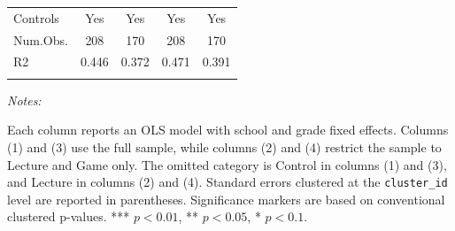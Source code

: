 \begin{table}[htbp]
\begin{tabular}{lcccc}
Controls & Yes & Yes & Yes & Yes \\
Num.Obs. & \num{208} & \num{170} & \num{208} & \num{170} \\
R2 & \num{0.446} & \num{0.372} & \num{0.471} & \num{0.391} \\
\\
\bottomrule
\hline
\hline
\end{tabular}
{\begin{flushleft}\parbox{\textwidth}{\tiny \hspace*{0.1cm}
\textit{Notes:}} Each column reports an OLS model with school and grade fixed effects. Columns (1) and (3) use the full sample, while columns (2) and (4) restrict the sample to Lecture and Game only. The omitted category is Control in columns (1) and (3), and Lecture in columns (2) and (4). Standard errors clustered at the \texttt{cluster\_id} level are reported in parentheses. Significance markers are based on conventional clustered p-values. *** $p < 0.01$, ** $p < 0.05$, * $p < 0.1$.
\end{flushleft}}
\end{table}
